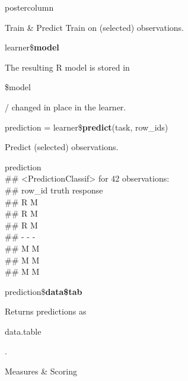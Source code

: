 \documentclass{beamer}
\newcommand{\codeinline}[1]{\begin{codeboxinline}#1\end{codeboxinline}}
\begin{document}
\begin{frame}[fragile]{}
\begin{columns}
\begin{column}{.245\textwidth}
\begin{beamercolorbox}[center]{postercolumn}
\begin{minipage}{.98\textwidth}
{\begin{myblock}{Train \& Predict}
	                        Train on (selected) observations. 
	   						\\
							\begin{codebox}
								learner\$\textbf{model}
							\end{codebox}
							The resulting R model is stored in \codeinline{\$model}/ changed in place in the learner.
							\\
							\vspace{1em} %
							\begin{codebox}
								prediction = learner\$\textbf{predict}(task, row\_ids)
							\end{codebox}
	                        Predict (selected) observations.
	                        \\
	                        \begin{codeboxmultiline}[width=23cm]
								{\footnotesize prediction\\
								\#\# <PredictionClassif> for 42 observations:\\
								\#\# row\_id truth response\\
								\#\# \space\space\space\space\space 2
								\space\space\space\space R \space\space\space\space\space\space\space M\\
								\#\# \space\space\space\space\space 3
								\space\space\space\space R \space\space\space\space\space\space\space M\\
								\#\# \space\space\space\space\space 5
								\space\space\space\space R \space\space\space\space\space\space\space M\\
								\#\# - - -\\
								\#\# \space\space\space 198
								\space\space\space\space M \space\space\space\space\space\space\space M\\
								\#\# \space\space{}00
								\space\space\space\space M \space\space\space\space\space\space\space M\\
								\#\# \space\space\space 207
								\space\space\space\space M \space\space\space\space\space\space\space M}
	                        \end{codeboxmultiline}
							\vspace{1em}
							\begin{codebox}
								prediction\$\textbf{data\$tab}
							\end{codebox}
							Returns predictions as \codeinline{data.table}.
	                    \end{myblock}
	                    \begin{myblock}{Measures \& Scoring}

\end{myblock}}
\end{minipage}
\end{beamercolorbox}
\end{column}
\end{columns}
\end{frame}
\end{document}
